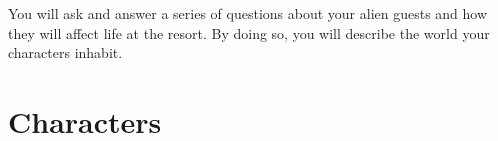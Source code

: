 \documentclass[a6paper, 11pt, parskip=half, DIV=15]{scrartcl}
\begin{document}
\begin{center}
\end{center}

\vfill

You will ask and answer a series of questions about your alien guests and how they will affect life at the resort. By doing so, you will describe the world your characters inhabit.

\newpage
\enlargethispage{1.75\baselineskip}

\section*{Characters}
\renewcommand{\thefootnote}{\fnsymbol{footnote}}
\renewcommand{\footnoterule}{%
  \kern -3pt
  \hrule width \textwidth height 0.5pt
  \kern 2pt
}
\end{document}
